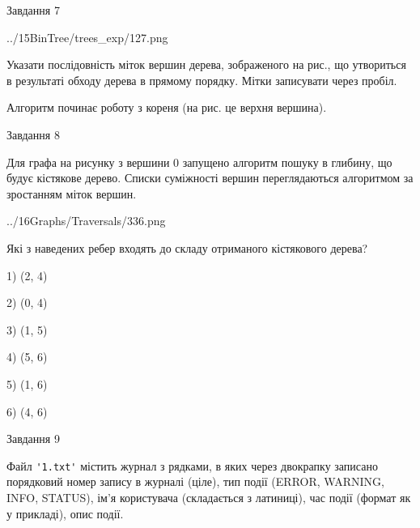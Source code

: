 \documentclass[12pt, ukrainian]{article}
\def\code#1{\Verb!#1!}
\begin{document}
{\vspace{10mm}\par

\newpage
\begin{minipage}[t]{9.7cm}
               
{\begin{center}Завдання {7}\end{center}}
\vspace{-4mm}

\begin{center}
	{../15BinTree/trees_exp/127.png}
\end{center}
Указати послідовність міток вершин дерева, зображеного на рис., що утвориться в результаті обходу дерева в прямому порядку. Мітки записувати через пробіл.\par Алгоритм починає роботу з кореня (на рис. це верхня вершина).\par

\end{minipage}
\vline \hspace{8mm}
\begin{minipage}[t]{8.0cm}
               
{\begin{center}Завдання {8}\end{center}}
\vspace{-4mm}
Для графа на рисунку з вершини 0 запущено алгоритм пошуку в глибину, що будує кістякове дерево. Списки суміжності вершин переглядаються алгоритмом за зростанням міток вершин.\par
\begin{center}
	{../16Graphs/Traversals/336.png}
\end{center}
\par Які з наведених ребер входять до складу отриманого кістякового дерева?\par
1) (2, 4)\par
2) (0, 4)\par
3) (1, 5)\par
4) (5, 6)\par
5) (1, 6)\par
6) (4, 6)\par
{\vskip 15pt} \par

\end{minipage}

               
{\begin{center}Завдання {9}\end{center}}
\vspace{-4mm}
Файл \code{'1.txt'} містить журнал з рядками, в яких через двокрапку записано поряд\-ко\-вий номер запису в журналі (ціле), тип події (ERROR, WARNING, INFO, STATUS), ім'я користувача (складається з латиниці), час події (фор\-мат як у прикладі), опис події.

}
\end{document}
